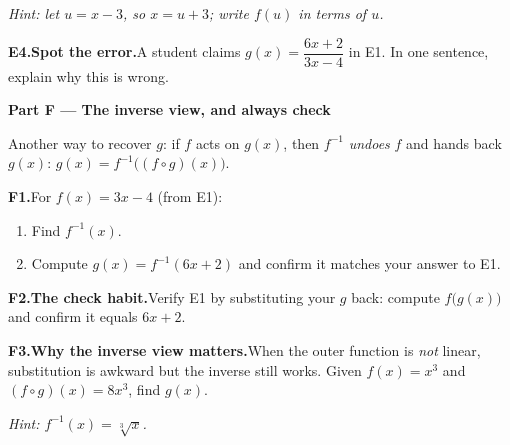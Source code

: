 \documentclass[12pt, twoside]{article}
\begin{document}
\noindent\emph{Hint: let $u=x-3$, so $x=u+3$; write $f(u)$ in terms of $u$.}
\vfill

\noindent\textbf{E4.\quad Spot the error.}\quad A student claims $g(x)=\dfrac{6x+2}{3x-4}$
in E1. In one sentence, explain why this is wrong.
\vfill

\newpage

\noindent\textbf{\large Part F --- The inverse view, and always check}

\medskip
\noindent Another way to recover $g$: if $f$ acts on $g(x)$, then $f^{-1}$ \emph{undoes}
$f$ and hands back $g(x)$: \quad $g(x)=f^{-1}\big((f\circ g)(x)\big)$.

\medskip
\noindent\textbf{F1.}\quad For $f(x)=3x-4$ (from E1):
\begin{enumerate}[itemsep=0.1cm, label=(\alph*)]
  \item Find $f^{-1}(x)$. \vfill
  \item Compute $g(x)=f^{-1}(6x+2)$ and confirm it matches your answer to E1. \vfill
\end{enumerate}

\medskip
\noindent\textbf{F2.\quad The check habit.}\quad Verify E1 by substituting your $g$ back:
compute $f\big(g(x)\big)$ and confirm it equals $6x+2$.
\vfill

\noindent\textbf{F3.\quad Why the inverse view matters.}\quad When the outer function is
\emph{not} linear, substitution is awkward but the inverse still works. Given
$f(x)=x^3$ and $(f\circ g)(x)=8x^3$, find $g(x)$.

\noindent\emph{Hint: $f^{-1}(x)=\sqrt[3]{x}$.}
\vfill
\end{document}
